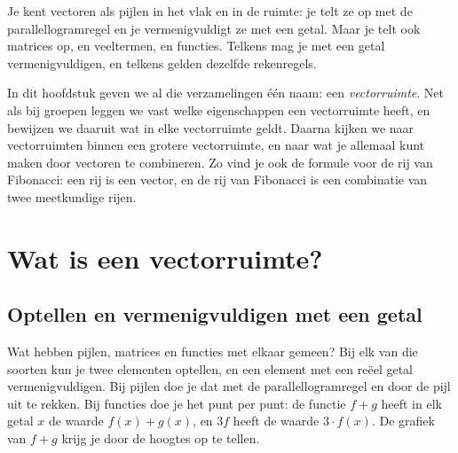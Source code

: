 Je kent vectoren als pijlen in het vlak en in de ruimte: je telt ze op met de parallellogramregel en je vermenigvuldigt ze met een getal. Maar je telt ook matrices op, en veeltermen, en functies. Telkens mag je met een getal vermenigvuldigen, en telkens gelden dezelfde rekenregels.

In dit hoofdstuk geven we al die verzamelingen één naam: een \textit{vectorruimte}. Net als bij groepen leggen we vast welke eigenschappen een vectorruimte heeft, en bewijzen we daaruit wat in elke vectorruimte geldt. Daarna kijken we naar vectorruimten binnen een grotere vectorruimte, en naar wat je allemaal kunt maken door vectoren te combineren. Zo vind je ook de formule voor de rij van Fibonacci: een rij is een vector, en de rij van Fibonacci is een combinatie van twee meetkundige rijen.

\begin{oefeningen}[Start]

\end{oefeningen}


\section{Wat is een vectorruimte?}

\subsection{Optellen en vermenigvuldigen met een getal}

Wat hebben pijlen, matrices en functies met elkaar gemeen? Bij elk van die soorten kun je twee elementen optellen, en een element met een reëel getal vermenigvuldigen. Bij pijlen doe je dat met de parallellogramregel en door de pijl uit te rekken. Bij functies doe je het punt per punt: de functie $f + g$ heeft in elk getal $x$ de waarde $f(x) + g(x)$, en $3f$ heeft de waarde $3 \cdot f(x)$. De grafiek van $f + g$ krijg je door de hoogtes op te tellen.

